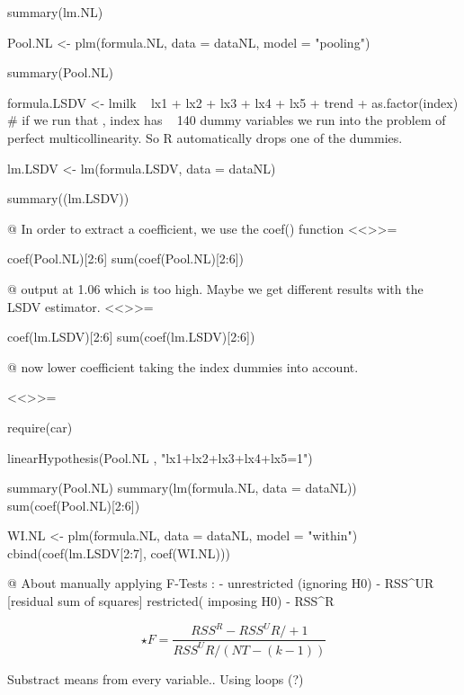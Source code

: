 \documentclass{article}
\begin{document}
                summary(lm.NL)
                
            Pool.NL <- plm(formula.NL, data = dataNL, model = "pooling")
            
            summary(Pool.NL)
            
            formula.LSDV <- lmilk ~ lx1 + lx2 + lx3 + lx4 + lx5 + trend + as.factor(index) # if we run that , index has ~ 140 dummy variables we run into the problem of perfect multicollinearity. So R automatically drops one of the dummies.
            
            lm.LSDV <- lm(formula.LSDV, data = dataNL)
      
            summary((lm.LSDV))
         
              @
            In order to extract a coefficient, we use the coef() function
            <<>>=
            
              coef(Pool.NL)[2:6]
              sum(coef(Pool.NL)[2:6])
              
              @
                output at 1.06 which is too high. Maybe we get different results with the LSDV estimator.
            <<>>=
            
              coef(lm.LSDV)[2:6]
              sum(coef(lm.LSDV)[2:6])
              
              @
              now lower coefficient taking the index dummies into account.
              
              <<>>=
            
             require(car)
              
              linearHypothesis(Pool.NL , "lx1+lx2+lx3+lx4+lx5=1")
              
              summary(Pool.NL)
              summary(lm(formula.NL, data = dataNL))
              sum(coef(Pool.NL)[2:6])
              
              WI.NL <- plm(formula.NL, data = dataNL, model = "within")
              cbind(coef(lm.LSDV[2:7], coef(WI.NL)))
              
              @
                About manually applying F-Tests :
                 - unrestricted (ignoring H0) - RSS^UR [residual sum of squares]
                 restricted( imposing H0) - RSS^R
                 
                 \[ \star F = \frac {RSS^R - RSS^UR / +1}{RSS^UR / (NT - (k-1))} \]
                 
                 
              Substract means from every variable.. Using loops (?)
              
\end{document}
